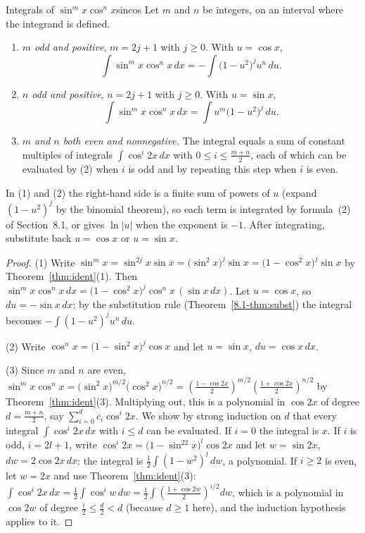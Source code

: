 \documentclass[11pt]{article}
\begin{document}
\begin{thm}{Integrals of $\sin^mx\cos^nx$}{sincos}
Let $m$ and $n$ be integers, on an interval where the integrand is defined.
\begin{enumerate}[label=(\arabic*)]
  \item \emph{$m$ odd and positive}, $m=2j+1$ with $j\ge0$. With $u=\cos x$,
  \[\int\sin^mx\cos^nx\,dx=-\int\big(1-u^2\big)^ju^n\,du .\]
  \item \emph{$n$ odd and positive}, $n=2j+1$ with $j\ge0$. With $u=\sin x$,
  \[\int\sin^mx\cos^nx\,dx=\int u^m\big(1-u^2\big)^j\,du .\]
  \item \emph{$m$ and $n$ both even and nonnegative.} The integral equals a sum of constant multiples of integrals $\int\cos^i2x\,dx$ with $0\le i\le\frac{m+n}2$, each of which can be evaluated by (2) when $i$ is odd and by repeating this step when $i$ is even.
\end{enumerate}
In (1) and (2) the right-hand side is a finite sum of powers of $u$ (expand $(1-u^2)^j$ by the binomial theorem), so each term is integrated by formula~(2) of Section~8.1, or gives $\ln\lvert u\rvert$ when the exponent is $-1$. After integrating, substitute back $u=\cos x$ or $u=\sin x$.
\end{thm}
\begin{proof}
(1) Write $\sin^mx=\sin^{2j}x\sin x=\big(\sin^2x\big)^j\sin x=\big(1-\cos^2x\big)^j\sin x$ by Theorem~\ref{thm:ident}(1). Then $\sin^mx\cos^nx\,dx=\big(1-\cos^2x\big)^j\cos^nx\,(\sin x\,dx)$. Let $u=\cos x$, so $du=-\sin x\,dx$; by the substitution rule (Theorem~\ref{8.1-thm:subst}) the integral becomes $-\int(1-u^2)^ju^n\,du$.

(2) Write $\cos^nx=\big(1-\sin^2x\big)^j\cos x$ and let $u=\sin x$, $du=\cos x\,dx$.

(3) Since $m$ and $n$ are even, $\sin^mx\cos^nx=\big(\sin^2x\big)^{m/2}\big(\cos^2x\big)^{n/2}=\left(\frac{1-\cos2x}2\right)^{m/2}\left(\frac{1+\cos2x}2\right)^{n/2}$ by Theorem~\ref{thm:ident}(3). Multiplying out, this is a polynomial in $\cos2x$ of degree $d=\frac{m+n}2$, say $\sum_{i=0}^dc_i\cos^i2x$. We show by strong induction on $d$ that every integral $\int\cos^i2x\,dx$ with $i\le d$ can be evaluated. If $i=0$ the integral is $x$. If $i$ is odd, $i=2l+1$, write $\cos^i2x=\big(1-\sin^22x\big)^l\cos2x$ and let $w=\sin2x$, $dw=2\cos2x\,dx$: the integral is $\frac12\int(1-w^2)^l\,dw$, a polynomial. If $i\ge2$ is even, let $w=2x$ and use Theorem~\ref{thm:ident}(3): $\int\cos^i2x\,dx=\frac12\int\cos^iw\,dw=\frac12\int\left(\frac{1+\cos2w}2\right)^{i/2}dw$, which is a polynomial in $\cos2w$ of degree $\frac i2\le\frac d2<d$ (because $d\ge1$ here), and the induction hypothesis applies to it.
\end{proof}
\end{document}
